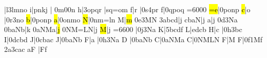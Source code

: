 \barre\notes{}|\na l\qqb3lmno\enotes
\temps\notes{}\hu i|pnkj\enotes
\barre\nspace\notes{}|\relax
   \ibl0m0\tqb0n\enotes
\temps\notes{}\hu h|\qqb3opqr\enotes
\barre\notes{}|sq{=o}m\enotes
\temps\notes{}\hu f|\ql r\enotes
\temps\notes|\Ilegu0s\dqb4pr\enotes
\barre\notes{}\hu f|\qqB0qpoq\enotes
\cleftoksi={{6}{0}{0}{0}}\changeclefs
\temps\notes{}\hl{=e}|\qqB0ponp\enotes
\changecontexte
\Notes{}\hl c|\ql o\enotes
\temps\notes|\Ilegu0r\dqb3no\enotes
\temps\notes{}\hl b|\qqB0ponp\enotes
\temps\notes{}\hl a|\qqB0onmo\enotes
\generalmeter{\allabreve}\changecontexte
\notes{}\hl N|\qqB0nm{=l}n\enotes
\temps\Notes\boqu M|\hl m\enotes
\temps\notes{}\Ilegu0e\dqb3MN\enotes
\alaligne\notes\qqb3abcd|\hu j\enotes
\temps\notes{}cbaN|\hu j\enotes
\barre\Notes{}\ql a|\hu j\enotes
\temps\notes\Ilegu0d\dqb3Na\enotes
\temps\notes\qqb0baNb|\hu k\enotes%
\barre\notes\qqB0aNMa|\hl j\enotes
\temps\notes\qqB0NM{=L}N|\hu j\enotes
\barre\notes{}\hl M|\hu j\enotes
\cleftoksi={{6}{6}{0}{0}}\changeclefs
\notes|\Ilegu0j\dqh3Na\enotes
\temps\notes\bohu K|\qqh5bcdf\enotes
\barre\notes\bohu L|edcb\enotes
\temps\Notes\bohu H|\qu c\enotes
\temps\notes|\Ilegu0h\dqh3bc\enotes
\barre\notes\bohu I|\qqh0dcbd\enotes
\temps\notes\bohu J|\qqh0cbac\enotes
\barre\notes\bohu J|\qqh0baNb\enotes
\temps\notes\bohu F\sk|\qu a\enotes
\temps\notes|\Ilegu0h\dqh3Na\enotes
\barre\notes{}\bohu D\relax
    |\qqh0baNb\enotes
\temps\notes\bohu C|\qqh0aNMa\enotes
\barre\notes{}\bohu C|\qqh0NMLN\enotes
\temps\NOtes\bohu F|\hu M\enotes
\barre\notes\bohu F|\itenu0f\itenl1M\bohl f\sk\sk
\itenu2a\itenu3c\zq a\cu c\qsk\enotes
\NOtes\pointdorgue a\bohu F\relax
  |\pointdurgue F\bohl f\enotes
\finmorceau   \rightline{\sl \aujourdhui}
\eject\bye


\bye
